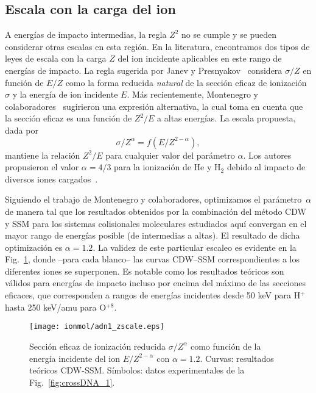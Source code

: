 \subsection{Escala con la carga del ion}
\label{sec:zscaling}

A energías de impacto intermedias, la regla $Z^2$ no se cumple y se 
pueden considerar otras escalas en esta región. En la literatura, 
encontramos dos tipos de leyes de escala con la carga $Z$ del ion 
incidente aplicables en este rango de energías de impacto. La regla 
sugerida por Janev y Presnyakov~\cite{Janev:80} considera $\sigma/Z$ en 
función de $E/Z$ como la forma reducida \textit{natural} de la sección 
eficaz de ionización $\sigma$ y la energía de ion incidente $E$. Más 
recientemente, Montenegro y colaboradores~\cite{Dubois:13,Montenegro:13} 
sugirieron una expresión alternativa, la cual toma en cuenta que la 
sección eficaz es una función de $Z^2/E$ a altas energías. La escala 
propuesta, dada por
\begin{equation}
 \sigma/Z^{\alpha}=f(E/Z^{2-\alpha}),
\label{eq:Montenegro}
\end{equation}
mantiene la relación $Z^2/E$ para cualquier valor del parámetro $\alpha$. 
Los autores propusieron el valor $\alpha=4/3$ para la ionización de He y
H$_2$ debido al impacto de diversos iones cargados~\cite{Dubois:13}. 

Siguiendo el trabajo de Montenegro y colaboradores, optimizamos el 
parámetro~$\alpha$ de manera tal que los resultados obtenidos por la 
combinación del método CDW y SSM para los sistemas colisionales 
moleculares estudiados aquí convergan en el mayor rango de energías 
posible (de intermedias a altas). El resultado de dicha optimización es 
$\alpha=1.2$. La validez de este particular escaleo es evidente en la 
Fig.~\ref{fig:zreduced}, donde --para cada blanco-- las curvas CDW--SSM 
correspondientes a los diferentes iones se superponen. Es notable como 
los resultados teóricos son válidos para energías de impacto incluso por 
encima del máximo de las secciones eficaces, que corresponden a rangos de 
energías incidentes desde 50 keV para H$^+$ hasta 250 keV/amu para 
O$^{+8}$.

\begin{figure}
\centering
\texttt{[image: ionmol/adn1\_zscale.eps]}
\caption[Sección eficaz de ionización reducida por $Z$ y $\alpha$ 
(Parte I).]
{Sección eficaz de ionización reducida $\sigma/Z^{\alpha}$ como función
de la energía incidente del ion $E/Z^{2-\alpha}$ con $\alpha=1.2$. 
Curvas: resultados teóricos CDW-SSM. 
Símbolos: datos experimentales de la Fig.~\ref{fig:crossDNA_1}.}
\label{fig:zreduced}
\end{figure} 

